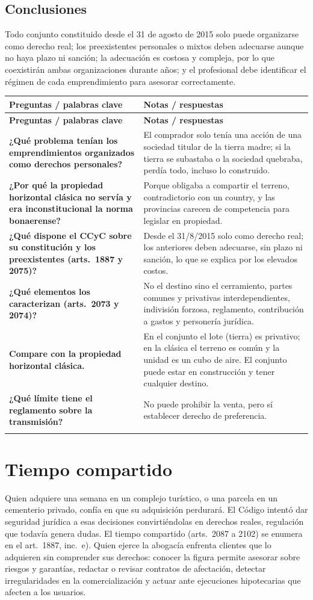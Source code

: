\documentclass[12pt,oneside]{book}
\makeatletter
\renewcommand{\arraystretch}{1.25}
\newcommand{\cq}[2]{\textbf{#1} & #2 \\[0.45em]}
\newcommand{\cornell}[3]{%
\par\bigskip\noindent{\large\bfseries Cuadro Cornell: #1}\par\nopagebreak\smallskip
\begingroup
\small
\renewcommand{\arraystretch}{1.15}
\begin{longtable}{@{}>{\raggedright\arraybackslash}p{0.26\textwidth}>{\raggedright\arraybackslash}p{0.66\textwidth}@{}}
\toprule
\textbf{Preguntas / palabras clave} & \textbf{Notas / respuestas} \\
\midrule
\endfirsthead
\toprule
\textbf{Preguntas / palabras clave} & \textbf{Notas / respuestas} \\
\midrule
\endhead
#2
\midrule
\multicolumn{2}{@{}p{\dimexpr0.92\textwidth+2\tabcolsep\relax}@{}}{\vspace{0.2em}\textbf{Resumen.} #3\vspace{0.2em}} \\
\bottomrule
\end{longtable}
\endgroup
}
\makeatother
\begin{document}
\section{Conclusiones}

Todo conjunto constituido desde el 31 de agosto de 2015 solo puede organizarse como derecho real; los preexistentes personales o mixtos deben adecuarse aunque no haya plazo ni sanción; la adecuación es costosa y compleja, por lo que coexistirán ambas organizaciones durante años; y el profesional debe identificar el régimen de cada emprendimiento para asesorar correctamente.

\cornell{conjuntos inmobiliarios}{
\cq{¿Qué problema tenían los emprendimientos organizados como derechos personales?}{El comprador solo tenía una acción de una sociedad titular de la tierra madre; si la tierra se subastaba o la sociedad quebraba, perdía todo, incluso lo construido.}
\cq{¿Por qué la propiedad horizontal clásica no servía y era inconstitucional la norma bonaerense?}{Porque obligaba a compartir el terreno, contradictorio con un country, y las provincias carecen de competencia para legislar en propiedad.}
\cq{¿Qué dispone el CCyC sobre su constitución y los preexistentes (arts.~1887 y 2075)?}{Desde el 31/8/2015 solo como derecho real; los anteriores deben adecuarse, sin plazo ni sanción, lo que se explica por los elevados costos.}
\cq{¿Qué elementos los caracterizan (arts.~2073 y 2074)?}{No el destino sino el cerramiento, partes comunes y privativas interdependientes, indivisión forzosa, reglamento, contribución a gastos y personería jurídica.}
\cq{Compare con la propiedad horizontal clásica.}{En el conjunto el lote (tierra) es privativo; en la clásica el terreno es común y la unidad es un cubo de aire. El conjunto puede estar en construcción y tener cualquier destino.}
\cq{¿Qué límite tiene el reglamento sobre la transmisión?}{No puede prohibir la venta, pero sí establecer derecho de preferencia.}
}{Los conjuntos inmobiliarios son una propiedad horizontal especial con lote exclusivo, partes comunes, reglamento y persona jurídica. Desde 2015 solo pueden constituirse como derecho real y los anteriores deben adecuarse, aunque sin plazo ni sanción.}

\chapter[Tiempo compartido]{Tiempo compartido}\label{cap:tc}

Quien adquiere una semana en un complejo turístico, o una parcela en un cementerio privado, confía en que su adquisición perdurará. El Código intentó dar seguridad jurídica a esas decisiones convirtiéndolas en derechos reales, regulación que todavía genera dudas. El tiempo compartido (arts.~2087 a 2102) se enumera en el art.~1887, inc.~e). Quien ejerce la abogacía enfrenta clientes que lo adquieren sin comprender sus derechos: conocer la figura permite asesorar sobre riesgos y garantías, redactar o revisar contratos de afectación, detectar irregularidades en la comercialización y actuar ante ejecuciones hipotecarias que afecten a los usuarios.
\end{document}
